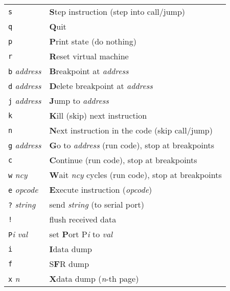 \documentclass{article}
\begin{document}
\begin{tabular}{ll}
  \texttt{s}&\textbf{S}tep instruction (step into call/jump)\\
  \texttt{q}&\textbf{Q}uit\\
  \texttt{p}&\textbf{P}rint state (do nothing)\\
  \texttt{r}&\textbf{R}eset virtual machine\\
  \texttt{b} \textit{address}&\textbf{B}reakpoint at \textit{address}\\
  \texttt{d} \textit{address}&\textbf{D}elete breakpoint at \textit{address}\\
  \texttt{j} \textit{address}&\textbf{J}ump to \textit{address}\\
  \texttt{k}&\textbf{K}ill (skip) next instruction\\
  \texttt{n}&\textbf{N}ext instruction in the code (skip call/jump)\\
  \texttt{g} \textit{address}&\textbf{G}o to \textit{address} (run
  code), stop at breakpoints\\
  \texttt{c}&\textbf{C}ontinue (run code), stop at breakpoints\\
  \texttt{w} \textit{ncy}&\textbf{W}ait \textit{ncy} cycles (run code),
  stop at breakpoints\\
  \texttt{e} \textit{opcode}&\textbf{E}xecute instruction (\textit{opcode})\\
  \texttt{?} \textit{string}&send \textit{string} (to serial port)\\
  \texttt{!}&flush received data\\
  \texttt{P}\textit{i} \textit{val}&
  set \textbf{P}ort P\textit{i} to \textit{val}\\
  \texttt{i}&\textbf{I}data dump\\
  \texttt{f}&S\textbf{F}R dump\\
  \texttt{x} \textit{n}&\textbf{X}data dump (\textit{n}-th page)
\end{tabular}
\end{document}
